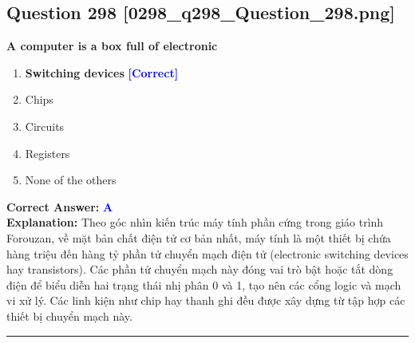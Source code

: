 \documentclass[11pt,a4paper]{article}
\begin{document}
\begin{minipage}{\textwidth}
\subsection*{Question 298 \quad \footnotesize{[0298\_q298\_Question\_298.png]}}
\noindent \textbf{A computer is a box full of electronic}

\begin{enumerate}[label=\Alph*.]
    \item \textbf{Switching devices} \hfill \textcolor{blue}{\textbf{[Correct]}}
    \item Chips
    \item Circuits
    \item Registers
    \item None of the others
\end{enumerate}

\noindent \textbf{Correct Answer:} \textcolor{blue}{\textbf{A}} \\[2pt]
\noindent \textbf{Explanation:} Theo góc nhìn kiến trúc máy tính phần cứng trong giáo trình Forouzan, về mặt bản chất điện tử cơ bản nhất, máy tính là một thiết bị chứa hàng triệu đến hàng tỷ phần tử chuyển mạch điện tử (electronic switching devices hay transistors). Các phần tử chuyển mạch này đóng vai trò bật hoặc tắt dòng điện để biểu diễn hai trạng thái nhị phân 0 và 1, tạo nên các cổng logic và mạch vi xử lý. Các linh kiện như chip hay thanh ghi đều được xây dựng từ tập hợp các thiết bị chuyển mạch này.

\par\vspace{0.3cm}
\hrule
\vspace{0.3cm}
\end{minipage}
\end{document}
